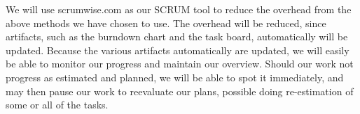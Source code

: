 We will use scrumwise.com as our SCRUM tool to reduce the overhead from the above methods we have chosen to use. The overhead will be reduced, since artifacts, such as the burndown chart and the task board, automatically will be updated.
Because the various artifacts automatically are updated, we will easily be able to monitor our progress and maintain our overview. Should our work not progress as estimated and planned, we will be able to spot it immediately, and may then pause our work to reevaluate our plans, possible doing re-estimation of some or all of the tasks.